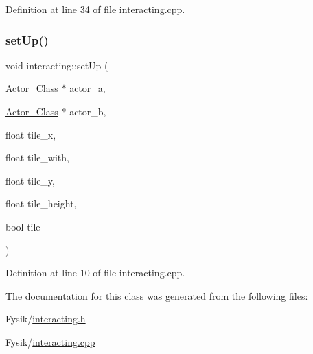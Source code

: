 Definition at line 34 of file interacting.\+cpp.

\hypertarget{classinteracting_a1a20b43d3119675a5946efb630bf6202}{}\label{classinteracting_a1a20b43d3119675a5946efb630bf6202} 
\subsubsection{\texorpdfstring{set\+Up()}{setUp()}}
{\footnotesize\ttfamily void interacting\+::set\+Up (\begin{DoxyParamCaption}\item[{\hyperlink{class_actor___class}{Actor\+\_\+\+Class} $\ast$}]{actor\+\_\+a,  }\item[{\hyperlink{class_actor___class}{Actor\+\_\+\+Class} $\ast$}]{actor\+\_\+b,  }\item[{float}]{tile\+\_\+x,  }\item[{float}]{tile\+\_\+with,  }\item[{float}]{tile\+\_\+y,  }\item[{float}]{tile\+\_\+height,  }\item[{bool}]{tile }\end{DoxyParamCaption})}



Definition at line 10 of file interacting.\+cpp.



The documentation for this class was generated from the following files\+:\begin{DoxyCompactItemize}
\item 
Fysik/\hyperlink{interacting_8h}{interacting.\+h}\item 
Fysik/\hyperlink{interacting_8cpp}{interacting.\+cpp}\end{DoxyCompactItemize}
